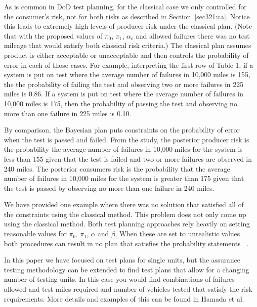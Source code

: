 \documentclass[12pt]{article}
\begin{document}
As is common in DoD test planning, for the classical case we only controlled for the consumer's risk, not for both risks as described in Section~\ref{sec321:ca}. Notice this leads to extremely high levels of producer risk under the classical plan. (Note that with the proposed values of  $\pi_0$, $\pi_1$, $\alpha_c$ and allowed failures there was no test mileage that would satisfy both classical risk criteria.) The classical plan assumes product is either acceptable or unacceptable and then controls the probability of error in each of those cases. For example, interpreting the first row of Table 1, if a system is put on test where the average number of failures in 10,000 miles is 155, the the probability of failing the test and observing two or more failures in 225 miles is 0.86. If a system is put on test where the average number of failures in 10,000 miles is 175, then the probability of passing the test and observing no more than one failure in 225 miles is 0.10.

By comparison, the Bayesian plan puts constraints on the probability of error when the test is passed and failed.  From the study, the posterior producer risk is the probability the average number of failures in 10,000 miles for the system is less than 155 given that the test is failed and two or more failures are observed in 240 miles. The posterior consumers risk is the probability that the average number of failures in 10,000 miles for the system is greater than 175 given that the test is passed by observing no more than one failure in 240 miles.

We have provided one example where there was no solution that satisfied all of the constraints using the classical method.
This problem does not only come up using the classical method.  Both test planning approaches rely heavily on setting reasonable values for $\pi_0$, $\pi_1$, $\alpha$ and $\beta$.   When these are set to unrealistic values both procedures can result in no plan that satisfies the probability statements ~\cite{ref9}.

In this paper we have focused on test plans for single units, but the assurance testing methodology can be extended to find test plans that
allow for a changing number of testing units.  In this case you would find
combinations of failures allowed and test miles required and number of vehicles
tested that satisfy the risk requirements. More details and examples of this can
be found in Hamada et al. ~\cite{ref4}
\end{document}
